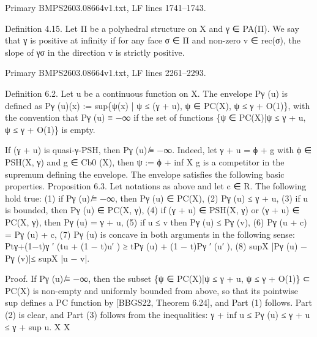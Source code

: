 \documentclass[
  11pt,
]{article}
\newenvironment{Shaded}{}{}
\newcommand{\NormalTok}[1]{#1}
\begin{document}
Primary BMPS2603.08664v1.txt, LF lines 1741--1743.

\begin{Shaded}
\begin{Highlighting}[]
\NormalTok{Definition 4.15. Let Π be a polyhedral structure on X and γ ∈ PA(Π). We say that γ is positive}
\NormalTok{at infinity if for any face σ ∈ Π and non{-}zero v ∈ rec(σ), the slope of γσ in the direction v is strictly}
\NormalTok{positive.}
\end{Highlighting}
\end{Shaded}

Primary BMPS2603.08664v1.txt, LF lines 2261--2293.

\begin{Shaded}
\begin{Highlighting}[]
\NormalTok{Definition 6.2. Let u be a continuous function on X. The envelope Pγ (u) is defined as}
\NormalTok{                   Pγ (u)(x) := sup\{ψ(x) | ψ ≤ (γ + u), ψ ∈ PC(X), ψ ≤ γ + O(1)\},}
\NormalTok{with the convention that Pγ (u) ≡ −∞ if the set of functions \{ψ ∈ PC(X)|ψ ≤ γ + u, ψ ≤ γ + O(1)\}}
\NormalTok{is empty.}

\NormalTok{   If (γ + u) is quasi{-}γ{-}PSH, then Pγ (u) ̸≡ −∞. Indeed, let γ + u = ϕ + g with ϕ ∈ PSH(X, γ) and}
\NormalTok{g ∈ Cb0 (X), then ψ := ϕ + inf X g is a competitor in the supremum defining the envelope.}
\NormalTok{     The envelope satisfies the following basic properties.}
\NormalTok{Proposition 6.3. Let notations as above and let c ∈ R. The following hold true:}
\NormalTok{     (1) if Pγ (u) ̸≡ −∞, then Pγ (u) ∈ PC(X),}
\NormalTok{     (2) Pγ (u) ≤ γ + u,}
\NormalTok{     (3) if u is bounded, then Pγ (u) ∈ PC(X, γ),}
\NormalTok{     (4) if (γ + u) ∈ PSH(X, γ) or (γ + u) ∈ PC(X, γ), then Pγ (u) = γ + u,}
\NormalTok{     (5) if u ≤ v then Pγ (u) ≤ Pγ (v),}
\NormalTok{     (6) Pγ (u + c) = Pγ (u) + c,}
\NormalTok{     (7) Pγ (u) is concave in both arguments in the following sense:}
\NormalTok{                         Ptγ+(1−t)γ ′ (tu + (1 − t)u′ ) ≥ tPγ (u) + (1 − t)Pγ ′ (u′ ),}
\NormalTok{     (8) supX |Pγ (u) − Pγ (v)|≤ supX |u − v|.}

\NormalTok{Proof. If Pγ (u) ̸≡ −∞, then the subset \{ψ ∈ PC(X)|ψ ≤ γ + u, ψ ≤ γ + O(1)\} ⊂ PC(X) is}
\NormalTok{non{-}empty and uniformly bounded from above, so that its pointwise sup defines a PC function by}
\NormalTok{[BBGS22, Theorem 6.24], and Part (1) follows. Part (2) is clear, and Part (3) follows from the}
\NormalTok{inequalities:}
\NormalTok{                            γ + inf u ≤ Pγ (u) ≤ γ + u ≤ γ + sup u.}
\NormalTok{                                      X                                 X}


\end{Highlighting}
\end{Shaded}
\end{document}
